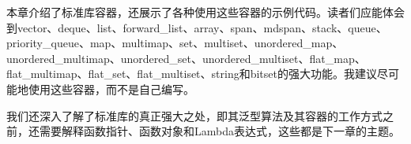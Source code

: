本章介绍了标准库容器，还展示了各种使用这些容器的示例代码。读者们应能体会到vector、deque、list、forward\_list、array、span、mdspan、stack、queue、priority\_queue、map、multimap、set、multiset、unordered\_map、unordered\_multimap、unordered\_set、unordered\_multiset、flat\_map、flat\_multimap、flat\_set、flat\_multiset、string和bitset的强大功能。我建议尽可能地使用这些容器，而不是自己编写。

我们还深入了解了标准库的真正强大之处，即其泛型算法及其容器的工作方式之前，还需要解释函数指针、函数对象和Lambda表达式，这些都是下一章的主题。